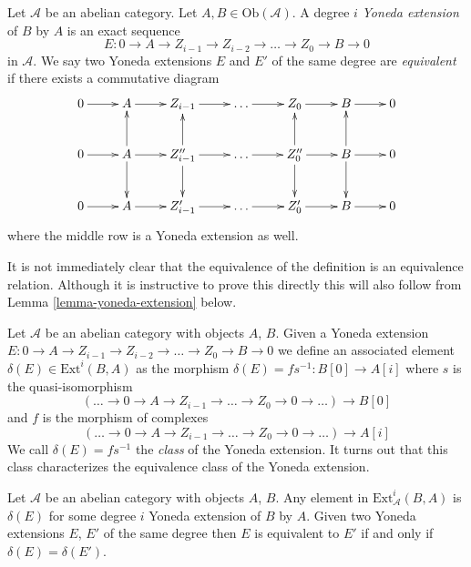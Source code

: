 \begin{definition}
\label{definition-yoneda-extension}
Let $\mathcal{A}$ be an abelian category.
Let $A, B \in \text{Ob}(\mathcal{A})$.
A degree $i$ {\it Yoneda extension} of $B$ by $A$ is an exact sequence
$$
E : 0 \to A \to Z_{i - 1} \to Z_{i - 2} \to \ldots \to Z_0 \to B \to 0
$$
in $\mathcal{A}$. We say two Yoneda extensions $E$ and $E'$ of the same degree
are {\it equivalent} if there exists a commutative diagram
$$
\xymatrix{
0 \ar[r] & A \ar[r] & Z_{i - 1} \ar[r] & \ldots \ar[r] &
Z_0 \ar[r] & B \ar[r] & 0 \\
0 \ar[r] &
A \ar[r] \ar[u] \ar[d] &
Z''_{i - 1} \ar[r] \ar[u] \ar[d] &
\ldots \ar[r] &
Z''_0 \ar[r] \ar[u] \ar[d] & B \ar[r] \ar[u] \ar[d] & 0 \\
0 \ar[r] & A \ar[r] & Z'_{i - 1} \ar[r] & \ldots \ar[r] &
Z'_0 \ar[r] & B \ar[r] & 0
}
$$
where the middle row is a Yoneda extension as well.
\end{definition}

\noindent
It is not immediately clear that the equivalence of the definition is
an equivalence relation. Although it is instructive to prove this directly
this will also follow from
Lemma \ref{lemma-yoneda-extension}
below.

\medskip\noindent
Let $\mathcal{A}$ be an abelian category with objects $A$, $B$.
Given a Yoneda extension
$E : 0 \to A \to Z_{i - 1} \to Z_{i - 2} \to \ldots \to Z_0 \to B \to 0$
we define an associated element $\delta(E) \in \text{Ext}^i(B, A)$
as the morphism $\delta(E) = fs^{-1} : B[0] \to A[i]$ where
$s$ is the quasi-isomorphism
$$
(\ldots \to 0 \to A \to Z_{i - 1} \to \ldots \to Z_0 \to 0 \to \ldots)
\longrightarrow
B[0]
$$
and $f$ is the morphism of complexes
$$
(\ldots \to 0 \to A \to Z_{i - 1} \to \ldots \to Z_0 \to 0 \to \ldots)
\longrightarrow
A[i]
$$
We call $\delta(E) = fs^{-1}$ the {\it class} of the Yoneda extension.
It turns out that this class characterizes the equivalence class
of the Yoneda extension.

\begin{lemma}
\label{lemma-yoneda-extension}
Let $\mathcal{A}$ be an abelian category with objects $A$, $B$.
Any element in $\text{Ext}^i_\mathcal{A}(B, A)$ is $\delta(E)$
for some degree $i$ Yoneda extension of $B$ by $A$.
Given two Yoneda extensions $E$, $E'$ of the same degree
then $E$ is equivalent to $E'$ if and only if $\delta(E) = \delta(E')$.
\end{lemma}

